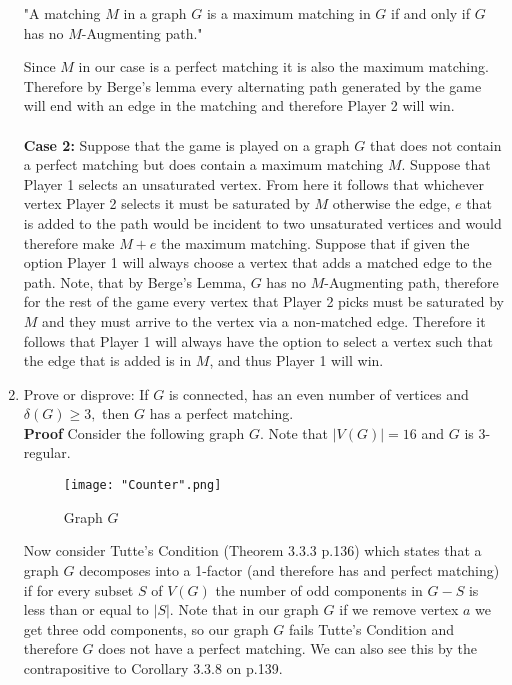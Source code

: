 \documentclass{amsart}
\begin{document}
\begin{enumerate}
\begin{displayquote}
"A matching $M$ in a graph $G$ is a maximum matching in $G$ if and only if $G$ has no $M$-Augmenting path."\\
\end{displayquote}

Since $M$ in our case is a perfect matching it is also the maximum matching. Therefore by Berge's lemma every alternating path generated by the game will end with an edge in the matching and therefore Player 2 will win. \\\\


\noindent \textbf{Case 2:} Suppose that the game is played on a graph $G$ that does not contain a perfect matching but does contain a maximum matching $M$. Suppose that Player 1 selects an unsaturated vertex. From here it follows that whichever vertex Player 2 selects it must be saturated by $M$ otherwise the edge, $e$ that is added to the path would be incident to two unsaturated vertices and would therefore make $M + e$ the maximum matching. Suppose that if given the option Player 1 will always choose a vertex that adds a matched edge to the path. Note, that by Berge's Lemma, $G$ has no $M$-Augmenting path, therefore for the rest of the game every vertex that Player 2 picks must be saturated by $M$ and they must arrive to the vertex via a non-matched edge. Therefore it follows that Player 1 will always have the option to select a vertex such that the edge that is added is in $M$, and thus Player 1 will win. 

\vspace{1.5in}



\item Prove or disprove: If $G$ is connected, has an even number of vertices and $\delta(G) \geq 3,$ then $G$ has a  perfect matching.\\


\textbf{Proof} Consider the following graph $G$. Note that $|V(G)| = 16$ and $G$ is $3$-regular. 
\begin{figure}[H]
\caption{Graph $G$}
\centering
\texttt{[image: "Counter".png]}
\end{figure}
Now consider Tutte's Condition (Theorem 3.3.3 p.136) which states that a graph $G$ decomposes into a 1-factor (and therefore has and perfect matching) if for every subset $S$ of $V(G)$ the number of odd components in $G-S$ is less than or equal to $|S|$. Note that in our graph $G$ if we remove vertex $a$ we get three odd components, so our graph $G$ fails Tutte's Condition and therefore $G$ does not have a perfect matching. We can also see this by the contrapositive to Corollary 3.3.8 on p.139.





\vspace{1.5in}


\end{enumerate}
\end{document}
